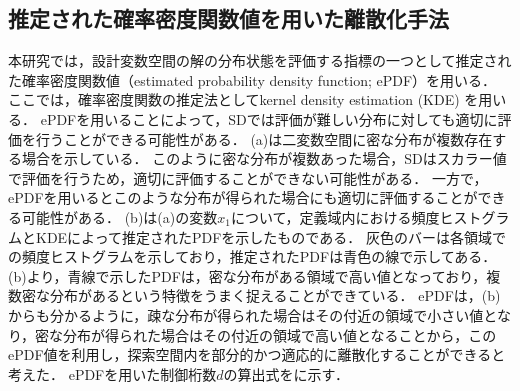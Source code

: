 \documentclass[../main/main]{subfiles}
\begin{document}
\subsection{推定された確率密度関数値を用いた離散化手法}
\quad 本研究では，設計変数空間の解の分布状態を評価する指標の一つとして推定された確率密度関数値（estimated probability density function; ePDF）を用いる．
ここでは，確率密度関数の推定法としてkernel density estimation (KDE) を用いる．
ePDFを用いることによって，SDでは評価が難しい分布に対しても適切に評価を行うことができる可能性がある．
(a)は二変数空間に密な分布が複数存在する場合を示している．
このように密な分布が複数あった場合，SDはスカラー値で評価を行うため，適切に評価することができない可能性がある．
一方で，ePDFを用いるとこのような分布が得られた場合にも適切に評価することができる可能性がある．
(b)は(a)の変数$x_1$について，定義域内における頻度ヒストグラムとKDEによって推定されたPDFを示したものである．
灰色のバーは各領域での頻度ヒストグラムを示しており，推定されたPDFは青色の線で示してある．
(b)より，青線で示したPDFは，密な分布がある領域で高い値となっており，複数密な分布があるという特徴をうまく捉えることができている．
ePDFは，(b)からも分かるように，疎な分布が得られた場合はその付近の領域で小さい値となり，密な分布が得られた場合はその付近の領域で高い値となることから，このePDF値を利用し，探索空間内を部分的かつ適応的に離散化することができると考えた．
ePDFを用いた制御桁数$d$の算出式をに示す．
\end{document}
